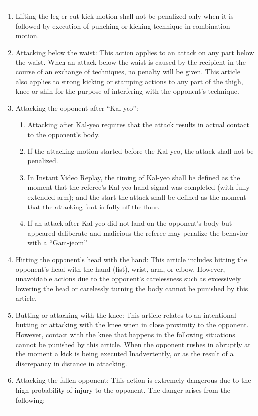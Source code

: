 \documentclass[]{report}
\renewcommand{\labelenumii}{\arabic{enumi}.\arabic{enumii}}
\newenvironment{expl}[0]%
  {\rule{\textwidth}{.2pt}\footnotesize}%
  {\rule{\textwidth}{.2pt}\normalsize}
\begin{document}
\begin{expl}
\begin{enumerate}
\begin{enumerate}
\end{enumerate}

\item
  Lifting the leg or cut kick motion shall not be penalized only when it
  is followed by execution of punching or kicking technique in
  combination motion.

\item
  Attacking below the waist: This action applies to an attack on any
  part below the waist. When an attack below the waist is caused by the
  recipient in the course of an exchange of techniques, no penalty will
  be given. This article also applies to strong kicking or stamping
  actions to any part of the thigh, knee or shin for the purpose of
  interfering with the opponent's technique.
\item
  Attacking the opponent after ``Kal-yeo'':

\begin{enumerate}
\def\labelenumii{\alph{enumii})}
\item
  Attacking after Kal-yeo requires that the attack results in actual
contact to the opponent's body.

\item 
  If the attacking motion started before the Kal-yeo, the attack shall not be penalized.

\item 
  In Instant Video Replay, the timing of Kal-yeo shall be defined as the moment that the
  referee's Kal-yeo hand signal was completed (with fully extended arm);
  and the start the attack shall be defined as the moment that the
  attacking foot is fully off the floor.

\item
  If an attack after Kal-yeo did not land on the opponent's body but appeared deliberate and malicious
  the referee may penalize the behavior with a ``Gam-jeom''

\end{enumerate}

\item
  Hitting the opponent's head with the hand: This article includes
  hitting the opponent's head with the hand (fist), wrist, arm, or
  elbow. However, unavoidable actions due to the opponent's carelessness
  such as excessively lowering the head or carelessly turning the body
  cannot be punished by this article.
\item
  Butting or attacking with the knee: This article relates to an
  intentional butting or attacking with the knee when in close proximity
  to the opponent. However, contact with the knee that happens in the
  following situations cannot be punished by this article. When the
  opponent rushes in abruptly at the moment a kick is being executed
  Inadvertently, or as the result of a discrepancy in distance in
  attacking.
\item
  Attacking the fallen opponent: This action is extremely dangerous due
  to the high probability of injury to the opponent. The danger arises
  from the following:


\end{enumerate}
\end{expl}
\end{document}
